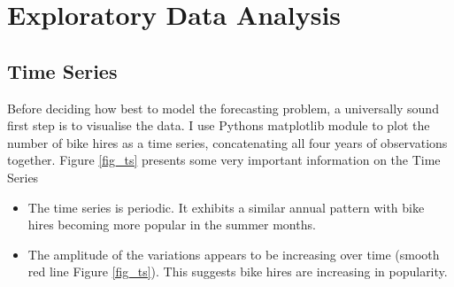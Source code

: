 \documentclass[10pt]{article}
\begin{document}
\section{Exploratory Data Analysis}
\label{sec_exp}

\subsection{Time Series}
Before deciding how best to model the forecasting problem, a universally sound first step is to visualise the data. I use Pythons matplotlib module to plot the number of bike hires as a time series, concatenating all four years of observations together. Figure \ref{fig_ts} presents some very important information on the Time Series

\begin{itemize}
\item The time series is periodic. It exhibits a similar annual pattern with bike hires becoming more popular in the summer months.

\item The amplitude of the variations appears to be increasing over time (smooth red line Figure \ref{fig_ts}). This suggests bike hires are increasing in popularity.
\end{itemize}
\end{document}

